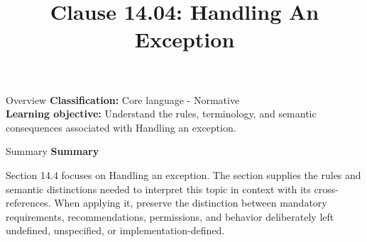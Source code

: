\documentclass[10pt,letterpaper]{article}
\title{Clause 14.04: Handling An Exception}
\author{}
\date{}
\begin{document}
\maketitle
\begin{CornellOverviewBox}{Overview}
\textbf{Classification:} Core language - Normative\\[2pt]
\textbf{Learning objective:} Understand the rules, terminology, and semantic consequences associated with Handling an exception.
\end{CornellOverviewBox}\begin{CornellSummaryBox}{Summary}
{\sffamily\bfseries\color{Accent} Summary}\par\vspace{3pt}Section 14.4 focuses on Handling an exception. The section supplies the rules and semantic distinctions needed to interpret this topic in context with its cross-references. When applying it, preserve the distinction between mandatory requirements, recommendations, permissions, and behavior deliberately left undefined, unspecified, or implementation-defined.
\end{CornellSummaryBox}
\end{document}

